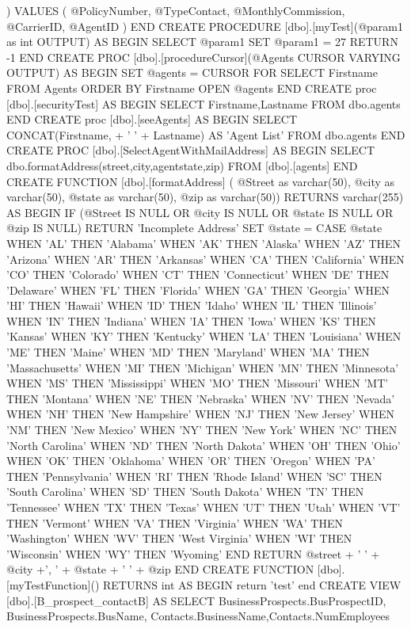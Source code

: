 		   )
     VALUES
           (
			@PolicyNumber, @TypeContact, @MonthlyCommission, @CarrierID, @AgentID 
		   )
END
CREATE PROCEDURE [dbo].[myTest](@param1 as int OUTPUT) AS BEGIN
	SELECT @param1
	SET @param1 = 27
	RETURN -1
END
CREATE PROC [dbo].[procedureCursor](@Agents CURSOR VARYING OUTPUT) AS BEGIN
	SET @agents = CURSOR FOR
	SELECT Firstname
	FROM Agents
	ORDER BY Firstname
	OPEN @agents
END
CREATE proc [dbo].[securityTest]
AS BEGIN
	SELECT Firstname,Lastname
	FROM dbo.agents
END
CREATE proc [dbo].[seeAgents]
AS BEGIN
	SELECT CONCAT(Firstname, + ' ' + Lastname) AS 'Agent List'
	FROM dbo.agents
END
CREATE PROC [dbo].[SelectAgentWithMailAddress]
AS BEGIN
SELECT dbo.formatAddress(street,city,agentstate,zip) FROM [dbo].[agents]
END
CREATE FUNCTION [dbo].[formatAddress]
(
@Street as varchar(50), @city as varchar(50), @state as varchar(50), @zip as varchar(50)) RETURNS varchar(255) AS BEGIN
	IF (@Street IS NULL OR
	@city IS NULL OR
	@state IS NULL OR
	@zip IS NULL)
	RETURN 'Incomplete Address'
SET @state = 
CASE @state
	WHEN 'AL' THEN 'Alabama'
WHEN 'AK' THEN 'Alaska'	
WHEN 'AZ' THEN 'Arizona'	
WHEN 'AR' THEN 'Arkansas'	
WHEN 'CA' THEN 'California'	
WHEN 'CO' THEN 'Colorado'
WHEN 'CT' THEN 'Connecticut'
WHEN 'DE' THEN 'Delaware'
WHEN 'FL' THEN 'Florida'
WHEN 'GA' THEN 'Georgia'
WHEN 'HI' THEN 'Hawaii'
WHEN 'ID' THEN 'Idaho'
WHEN 'IL' THEN 'Illinois'
WHEN 'IN' THEN 'Indiana'
WHEN 'IA' THEN 'Iowa'
WHEN 'KS' THEN 'Kansas'
WHEN 'KY' THEN 'Kentucky'
WHEN 'LA' THEN 'Louisiana'
WHEN 'ME' THEN 'Maine'
WHEN 'MD' THEN 'Maryland'
WHEN 'MA' THEN 'Massachusetts'
WHEN 'MI' THEN 'Michigan'
WHEN 'MN' THEN 'Minnesota'
WHEN 'MS' THEN 'Mississippi'
WHEN 'MO' THEN 'Missouri'
WHEN 'MT' THEN 'Montana'
WHEN 'NE' THEN 'Nebraska'
WHEN 'NV' THEN 'Nevada'
WHEN 'NH' THEN 'New Hampshire'
WHEN 'NJ' THEN 'New Jersey'
WHEN 'NM' THEN 'New Mexico'
WHEN 'NY' THEN 'New York'
WHEN 'NC' THEN 'North Carolina'
WHEN 'ND' THEN 'North Dakota'
WHEN 'OH' THEN 'Ohio'
WHEN 'OK' THEN 'Oklahoma'
WHEN 'OR' THEN 'Oregon'
WHEN 'PA' THEN 'Pennsylvania'
WHEN 'RI' THEN 'Rhode Island'
WHEN 'SC' THEN 'South Carolina'
WHEN 'SD' THEN 'South Dakota'
WHEN 'TN' THEN 'Tennessee'
WHEN 'TX' THEN 'Texas'
WHEN 'UT' THEN 'Utah'
WHEN 'VT' THEN 'Vermont'
WHEN 'VA' THEN 'Virginia'
WHEN 'WA' THEN 'Washington'
WHEN 'WV' THEN 'West Virginia'
WHEN 'WI' THEN 'Wisconsin'
WHEN 'WY' THEN 'Wyoming'
END
RETURN @street + ' ' + @city +', ' + @state + ' ' + @zip
END
CREATE FUNCTION [dbo].[myTestFunction]() RETURNS int AS BEGIN
	return 'test'
end
	CREATE VIEW [dbo].[B_prospect_contactB] AS
	SELECT  BusinessProspects.BusProspectID, BusinessProspects.BusName, Contacts.BusinessName,Contacts.NumEmployees
